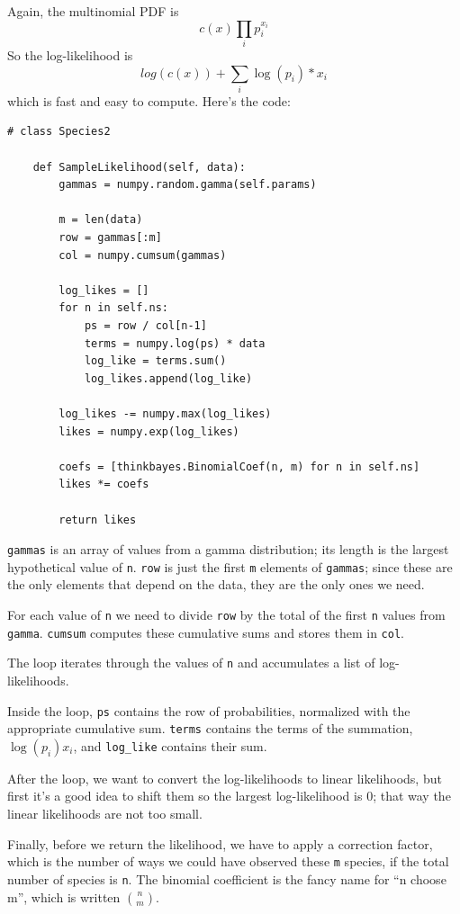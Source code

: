 \documentclass[12pt]{book}
\begin{document}
Again, the multinomial PDF is
%
\[ c(x) \prod_i p_i^{x_i}\]
%
So the log-likelihood is
%
\[ log(c(x)) + \sum_i \log(p_i) * x_i \]
%
which is fast and easy to compute.  Here's the code:

\begin{verbatim}
# class Species2

    def SampleLikelihood(self, data):
        gammas = numpy.random.gamma(self.params)

        m = len(data)
        row = gammas[:m]
        col = numpy.cumsum(gammas)

        log_likes = []
        for n in self.ns:
            ps = row / col[n-1]
            terms = numpy.log(ps) * data
            log_like = terms.sum()
            log_likes.append(log_like)

        log_likes -= numpy.max(log_likes)
        likes = numpy.exp(log_likes)

        coefs = [thinkbayes.BinomialCoef(n, m) for n in self.ns]
        likes *= coefs

        return likes
\end{verbatim}

{\tt gammas} is an array of values from a gamma distribution; its
length is the largest hypothetical value of {\tt n}.  {\tt row} is
just the first {\tt m} elements of {\tt gammas}; since these are the
only elements that depend on the data, they are the only ones we need.

For each value of {\tt n} we need to divide {\tt row} by the
total of the first {\tt n} values from {\tt gamma}.  {\tt cumsum}
computes these cumulative sums and stores them in {\tt col}.

The loop iterates through the values of {\tt n} and accumulates
a list of log-likelihoods.

Inside the loop, {\tt ps} contains the row of probabilities, normalized
with the appropriate cumulative sum.  {\tt terms} contains the
terms of the summation, $\log(p_i) x_i$, and \verb"log_like" contains
their sum.

After the loop, we want to convert the log-likelihoods to linear
likelihoods, but first it's a good idea to shift them so the largest
log-likelihood is 0; that way the linear likelihoods are not too
small.

Finally, before we return the likelihood, we have to apply a correction
factor, which is the number of ways we could have observed these {\tt m}
species, if the total number of species is {\tt n}.  The binomial
coefficient is the fancy name for ``n choose m'', which is written
$\binom{n}{m}$. 
\end{document}
